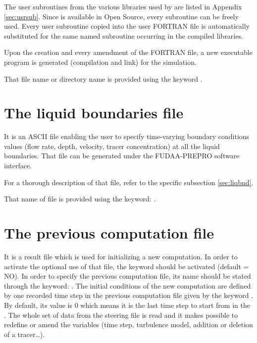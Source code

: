 The user subroutines from the various libraries used by  are listed
in Appendix \ref{sec:usrsub}. Since  is available in Open Source, every
subroutine can be freely used. Every user subroutine copied into the user
FORTRAN file is automatically substituted for the same named subroutine
occurring in the  compiled libraries.

Upon the creation and every amendment of the FORTRAN file, a new executable
program is generated (compilation and link) for the simulation.

That file name or directory name is provided using the keyword
.


\section{The liquid boundaries file}

It is an ASCII file enabling the user to specify time-varying boundary
conditions values (flow rate, depth, velocity, tracer concentration) at all the
liquid boundaries. That file can be generated under the FUDAA-PREPRO software
interface.

For a thorough description of that file, refer to the specific subsection
\ref{sec:liqbnd}.

That name of file is provided using the keyword: .


\section{The previous computation file}
\label{sec:previousfile}

It is a  result file which is used for initializing a new
computation. In order to activate the optional use of that file, the keyword
 should be activated (default = NO).
In order to specify the
previous computation file, its name should be stated through the keyword:
. The initial conditions of the new
computation are defined by one recorded time step in the previous
computation file given by the keyword .
By default, its value is 0 which means it is the last time step
to start from in the .
The whole set of data from the steering file is read and it
makes possible to redefine or amend the variables (time step, turbulence model,
addition or deletion of a tracer\dots).

